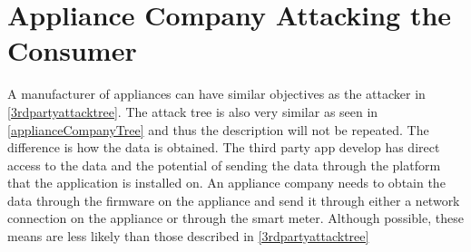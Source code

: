 
\section{Appliance Company Attacking the Consumer}
A manufacturer of appliances can have similar objectives as the attacker in \cref{3rdpartyattacktree}.
The attack tree is also very similar as seen in \cref{applianceCompanyTree} and thus the description will not be repeated.
The difference is how the data is obtained.
The third party app develop has direct access to the data and the potential of sending the data through the platform that the application is installed on.
An appliance company needs to obtain the data through the firmware on the appliance and send it through either a network connection on the appliance or through the smart meter.
Although possible, these means are less likely than those described in \cref{3rdpartyattacktree}


